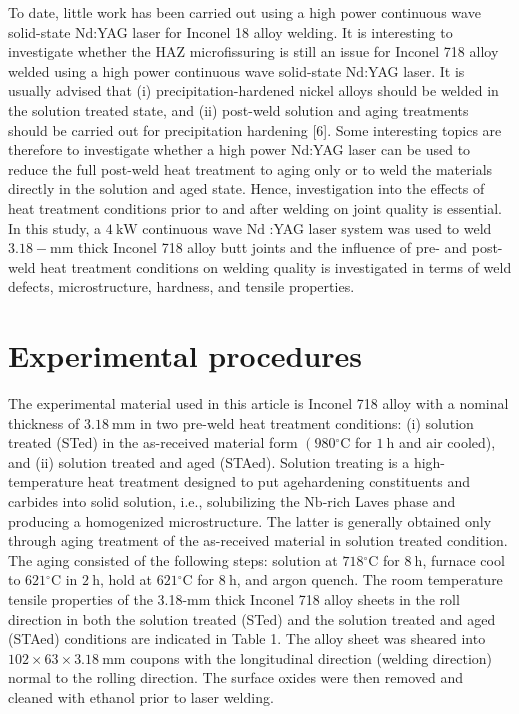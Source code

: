 \documentclass[10pt]{article}
\begin{document}
To date, little work has been carried out using a high power continuous wave solid-state Nd:YAG laser for Inconel 18 alloy welding. It is interesting to investigate whether the HAZ microfissuring is still an issue for Inconel 718 alloy welded using a high power continuous wave solid-state Nd:YAG laser. It is usually advised that (i) precipitation-hardened nickel alloys should be welded in the solution treated state, and (ii) post-weld solution and aging treatments should be carried out for precipitation hardening [6]. Some interesting topics are therefore to investigate whether a high power Nd:YAG laser can be used to reduce the full post-weld heat treatment to aging only or to weld the materials directly in the solution and aged state. Hence, investigation into the effects of heat treatment conditions prior to and after welding on joint quality is essential. In this study, a $4 \mathrm{~kW}$ continuous wave $\mathrm{Nd}$ :YAG laser system was used to weld $3.18-\mathrm{mm}$ thick Inconel 718 alloy butt joints and the influence of pre- and post-weld heat treatment conditions on welding quality is investigated in terms of weld defects, microstructure, hardness, and tensile properties.

\section*{Experimental procedures}
The experimental material used in this article is Inconel 718 alloy with a nominal thickness of $3.18 \mathrm{~mm}$ in two pre-weld heat treatment conditions: (i) solution treated (STed) in the as-received material form $\left(980{ }^{\circ} \mathrm{C}\right.$ for $1 \mathrm{~h}$ and air cooled), and (ii) solution treated and aged (STAed). Solution treating is a high-temperature heat treatment designed to put agehardening constituents and carbides into solid solution, i.e., solubilizing the $\mathrm{Nb}$-rich Laves phase and producing a homogenized microstructure. The latter is generally obtained only through aging treatment of the as-received material in solution treated condition. The aging consisted of the following steps: solution at $718{ }^{\circ} \mathrm{C}$ for $8 \mathrm{~h}$, furnace cool to $621{ }^{\circ} \mathrm{C}$ in $2 \mathrm{~h}$, hold at $621{ }^{\circ} \mathrm{C}$ for $8 \mathrm{~h}$, and argon quench. The room temperature tensile properties of the 3.18-mm thick Inconel 718 alloy sheets in the roll direction in both the solution treated (STed) and the solution treated and aged (STAed) conditions are indicated in Table 1. The alloy sheet was sheared into $102 \times 63 \times 3.18 \mathrm{~mm}$ coupons with the longitudinal direction (welding direction) normal to the rolling direction. The surface oxides were then removed and cleaned with ethanol prior to laser welding.
\end{document}
